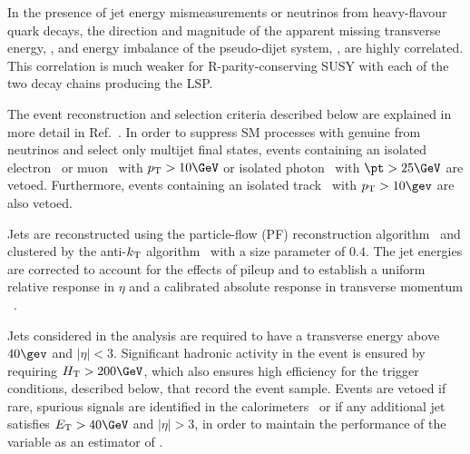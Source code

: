 %
%
In the presence of jet energy mismeasurements or neutrinos from
heavy-flavour quark decays, the direction and magnitude of the
apparent missing transverse energy, \mht, and energy imbalance of the
pseudo-dijet system, \dht, are highly correlated. This correlation is
much weaker for R-parity-conserving SUSY with each of the two decay
chains producing the LSP.

The event reconstruction and selection criteria described below are
explained in more detail in Ref.~\cite{RA1Paper2012}.
In order to suppress SM processes with genuine \met from neutrinos and
select only multijet final states, events containing an isolated
electron~\cite{PAS-EGM-10-004} or muon~\cite{PAS-MUO-10-004} with $\Pt
> 10\GeV$ or isolated photon~\cite{PAS-EGM-10-006} with $\pt > 25\GeV$
are vetoed. Furthermore, events containing an isolated
track~\cite{single-lepton-stop} with $\Pt > 10\gev$ are also vetoed.

Jets are reconstructed using the particle-flow (PF) reconstruction
algorithm~\cite{CMS-PAS-PFT-09-001, CMS-PAS-PFT-10-001} and 
clustered by the anti-$k_{\rm T}$ algorithm~\cite{antikt} with
a size parameter of $0.4$. The jet energies %
are corrected to account for the effects of pileup
and to establish a uniform relative response in $\eta$ and a
calibrated absolute response in transverse momentum
\pt~\cite{2011arXiv1107.4277C}.

Jets considered in the analysis are required to have a transverse
energy above $40\gev$ and $|\eta| < 3$. %
Significant hadronic activity
in the event is ensured by requiring $\scalht > 200\GeV$, which also
ensures high efficiency for the trigger conditions, described below,
that record the event sample.
%
Events are vetoed if rare, spurious signals are identified in the
calorimeters~\cite{1748-0221-5-03-T03014, CMS-NOTE-2010-012} or if any
additional jet satisfies $\Et > 40\GeV$ and $|\eta| > 3$, in order to
maintain the performance of the variable \mht as an estimator of \met.

